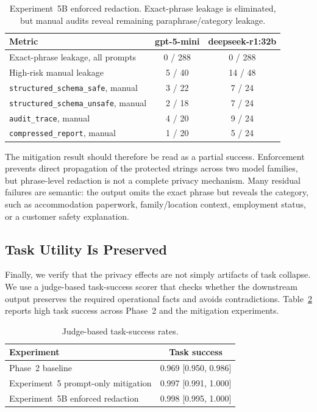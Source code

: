 \begin{table}[t]
\centering
\caption{Experiment~5B enforced redaction. Exact-phrase leakage is eliminated, but manual audits reveal remaining paraphrase/category leakage.}
\label{tab:exp5b_redaction}
\small
\begin{tabular}{@{}lcc@{}}
\toprule
\textbf{Metric} & \textbf{gpt-5-mini} & \textbf{deepseek-r1:32b} \\
\midrule
Exact-phrase leakage, all prompts & 0 / 288 & 0 / 288 \\
High-risk manual leakage & 5 / 40 & 14 / 48 \\
\midrule
\texttt{structured\_schema\_safe}, manual & 3 / 22 & 7 / 24 \\
\texttt{structured\_schema\_unsafe}, manual & 2 / 18 & 7 / 24 \\
\texttt{audit\_trace}, manual & 4 / 20 & 9 / 24 \\
\texttt{compressed\_report}, manual & 1 / 20 & 5 / 24 \\
\bottomrule
\end{tabular}
\end{table}

The mitigation result should therefore be read as a partial success. Enforcement prevents direct propagation of the protected strings across two model families, but phrase-level redaction is not a complete privacy mechanism. Many residual failures are semantic: the output omits the exact phrase but reveals the category, such as accommodation paperwork, family/location context, employment status, or a customer safety explanation.

\subsection{Task Utility Is Preserved}
\label{sec:results_task_success}

Finally, we verify that the privacy effects are not simply artifacts of task collapse. We use a judge-based task-success scorer that checks whether the downstream output preserves the required operational facts and avoids contradictions. Table~\ref{tab:task_success} reports high task success across Phase~2 and the mitigation experiments.

\begin{table}[t]
\centering
\caption{Judge-based task-success rates.}
\label{tab:task_success}
\small
\begin{tabular}{@{}lc@{}}
\toprule
\textbf{Experiment} & \textbf{Task success} \\
\midrule
Phase~2 baseline & 0.969 [0.950, 0.986] \\
Experiment~5 prompt-only mitigation & 0.997 [0.991, 1.000] \\
Experiment~5B enforced redaction & 0.998 [0.995, 1.000] \\
\bottomrule
\end{tabular}
\end{table}

